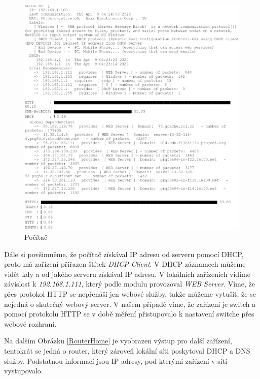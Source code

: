 \documentclass[thesis=B,czech,hidelinks]{FITthesis}[2019/03/21]
\begin{document}
    \begin{figure}[h!]
        \centering
        \includegraphics[scale=0.36]{PC_HomeNetwork.png}
        \caption[Ukázka měření: Počítač v domácí síti]{Počítač}
        \label{PCHome}
    \end{figure}
    \newpage
    
    Dále si povšimněme, že počítač získával IP adresu od serveru pomocí DHCP, proto má zařízení přiřazen štítek \emph{DHCP Client}. V DHCP záznamech můžeme vidět kdy a od jakého serveru získával IP adresu. V lokálních zařízeních vidíme závislost k \emph{192.168.1.111}, který podle modulu provozoval \emph{WEB Server}. Víme, že přes protokol HTTP se nepřenáší jen webové služby, takže můžeme vytušit, že se nejedná o skutečný webový server. V našem případě víme, že zařízení je switch a pomocí protokolu HTTP se v době měření přistupovalo k nastavení switche přes webové rozhraní.
    
    Na dalším Obrázku \ref{RouterHome} je vyobrazen výstup pro další zařízení, tentokrát se jedná o router, který zároveň lokální síti poskytoval DHCP a DNS služby. Podstatnou informací jsou IP adresy, pod kterými zařízení v síti vystupovalo. 
    
\end{document}
